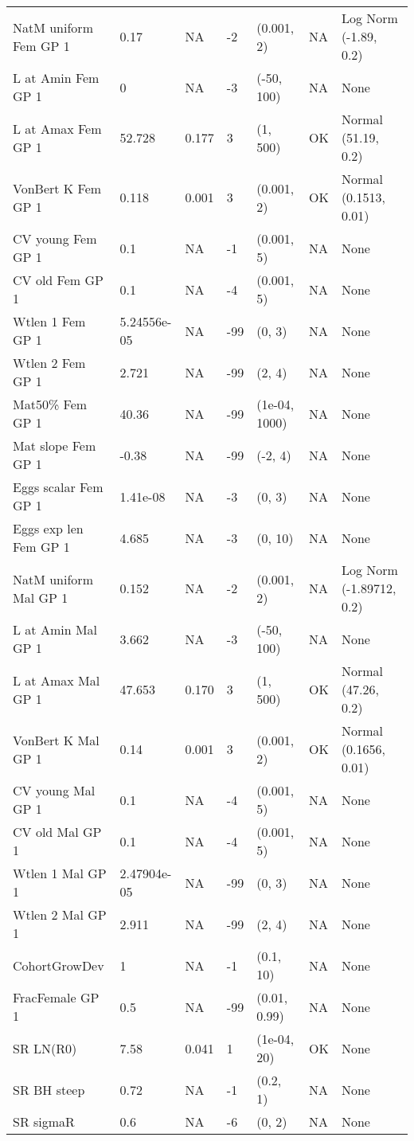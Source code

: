 \documentclass[11pt,
  english,
  letterpaper,
]{article}
\begin{document}
\begin{landscape}
\begin{longtable}[t]{>{\raggedright\arraybackslash}p{7.5cm}lllll>{\raggedright\arraybackslash}p{3.5cm}}
\endfoot
\bottomrule
\endlastfoot
NatM uniform Fem GP 1 & 0.17 & NA & -2 & (0.001, 2) & NA & Log Norm (-1.89, 0.2)\\
L at Amin Fem GP 1 & 0 & NA & -3 & (-50, 100) & NA & None\\
L at Amax Fem GP 1 & 52.728 & 0.177 & 3 & (1, 500) & OK & Normal (51.19, 0.2)\\
VonBert K Fem GP 1 & 0.118 & 0.001 & 3 & (0.001, 2) & OK & Normal (0.1513, 0.01)\\
CV young Fem GP 1 & 0.1 & NA & -1 & (0.001, 5) & NA & None\\
CV old Fem GP 1 & 0.1 & NA & -4 & (0.001, 5) & NA & None\\
Wtlen 1 Fem GP 1 & 5.24556e-05 & NA & -99 & (0, 3) & NA & None\\
Wtlen 2 Fem GP 1 & 2.721 & NA & -99 & (2, 4) & NA & None\\
Mat50\% Fem GP 1 & 40.36 & NA & -99 & (1e-04, 1000) & NA & None\\
Mat slope Fem GP 1 & -0.38 & NA & -99 & (-2, 4) & NA & None\\
Eggs scalar Fem GP 1 & 1.41e-08 & NA & -3 & (0, 3) & NA & None\\
Eggs exp len Fem GP 1 & 4.685 & NA & -3 & (0, 10) & NA & None\\
NatM uniform Mal GP 1 & 0.152 & NA & -2 & (0.001, 2) & NA & Log Norm (-1.89712, 0.2)\\
L at Amin Mal GP 1 & 3.662 & NA & -3 & (-50, 100) & NA & None\\
L at Amax Mal GP 1 & 47.653 & 0.170 & 3 & (1, 500) & OK & Normal (47.26, 0.2)\\
VonBert K Mal GP 1 & 0.14 & 0.001 & 3 & (0.001, 2) & OK & Normal (0.1656, 0.01)\\
CV young Mal GP 1 & 0.1 & NA & -4 & (0.001, 5) & NA & None\\
CV old Mal GP 1 & 0.1 & NA & -4 & (0.001, 5) & NA & None\\
Wtlen 1 Mal GP 1 & 2.47904e-05 & NA & -99 & (0, 3) & NA & None\\
Wtlen 2 Mal GP 1 & 2.911 & NA & -99 & (2, 4) & NA & None\\
CohortGrowDev & 1 & NA & -1 & (0.1, 10) & NA & None\\
FracFemale GP 1 & 0.5 & NA & -99 & (0.01, 0.99) & NA & None\\
SR LN(R0) & 7.58 & 0.041 & 1 & (1e-04, 20) & OK & None\\
SR BH steep & 0.72 & NA & -1 & (0.2, 1) & NA & None\\
SR sigmaR & 0.6 & NA & -6 & (0, 2) & NA & None\\

\end{longtable}
\end{landscape}
\end{document}
